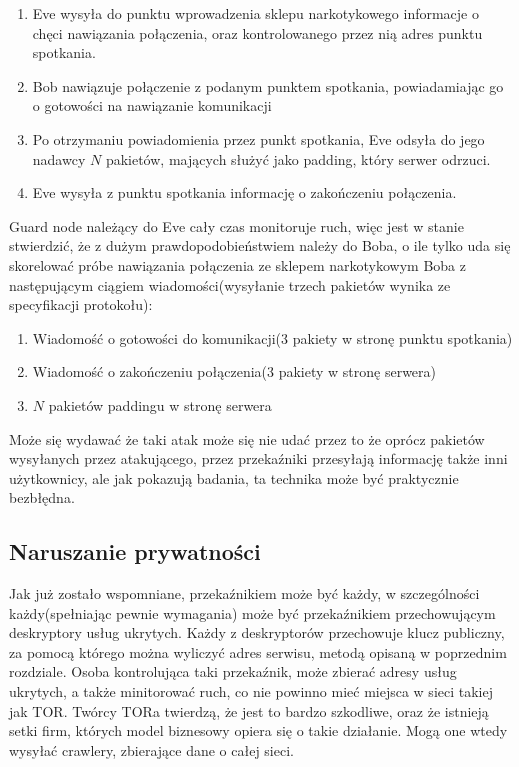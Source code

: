 \documentclass[polish]{kbk}
\begin{document}
\begin{enumerate}
\item Eve wysyła do punktu wprowadzenia sklepu narkotykowego informacje o chęci nawiązania
połączenia, oraz kontrolowanego przez nią adres punktu spotkania.
\item Bob nawiązuje połączenie z podanym punktem spotkania, powiadamiając go o gotowości na 
nawiązanie komunikacji
\item Po otrzymaniu powiadomienia przez punkt spotkania, Eve odsyła do jego nadawcy $N$
pakietów, mających służyć jako padding, który serwer odrzuci.
\item Eve wysyła z punktu spotkania informację o zakończeniu połączenia.
\end{enumerate}

Guard node należący do Eve cały czas monitoruje ruch, więc jest w stanie stwierdzić, że
z dużym prawdopodobieństwiem należy do Boba, o ile tylko uda się skorelować 
próbe nawiązania połączenia ze sklepem narkotykowym Boba z następującym ciągiem 
wiadomości(wysyłanie trzech pakietów wynika ze specyfikacji protokołu):

\begin{enumerate}
\item Wiadomość o gotowości do komunikacji(3 pakiety w stronę punktu spotkania)
\item Wiadomość o zakończeniu połączenia(3 pakiety w stronę serwera)
\item $N$ pakietów paddingu w stronę serwera
\end{enumerate}

Może się wydawać że taki atak może się nie udać przez to że oprócz pakietów wysyłanych
przez atakującego, przez przekaźniki przesyłają informację także inni użytkownicy,
ale jak pokazują badania\cite{deanonymisation}, ta technika może być praktycznie 
bezbłędna.

\subsection{Naruszanie prywatności}
Jak już zostało wspomniane, przekaźnikiem może być każdy, w szczególności każdy(spełniając
pewnie wymagania) może być przekaźnikiem przechowującym deskryptory usług ukrytych. Każdy z
deskryptorów przechowuje klucz publiczny, za pomocą którego można wyliczyć adres serwisu, 
metodą opisaną w poprzednim rozdziale. Osoba kontrolująca taki przekaźnik, może zbierać adresy
usług ukrytych, a także minitorować ruch, co nie powinno mieć miejsca w sieci takiej jak TOR.
Twórcy TORa twierdzą\cite{tortalk}, że jest to bardzo szkodliwe, oraz że istnieją setki firm, których model
biznesowy opiera się o takie działanie. Mogą one wtedy wysyłać crawlery, zbierające dane o całej sieci.
\end{document}
